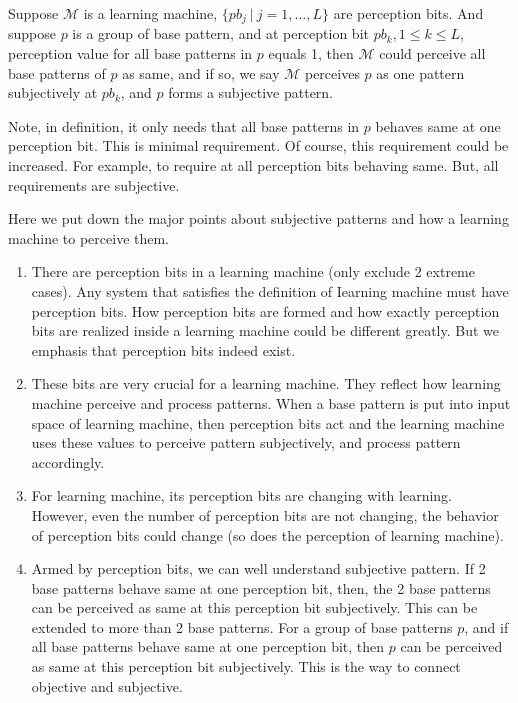 \begin{definition}
Suppose $\mathcal{M}$ is a learning machine, $\{pb_j \ |\ j = 1, \ldots, L\}$ are perception bits. And suppose $p$ is a group of base pattern, and  at perception bit $pb_k, 1\le k \le L$, perception value for all base patterns in $p$ equals 1, then $\mathcal{M}$ could perceive all base patterns of $p$ as same, and if so, we say $\mathcal{M}$ perceives $p$ as one pattern subjectively at $pb_k$, and $p$ forms a subjective pattern. 
\end{definition}
Note, in definition, it only needs that all base patterns in $p$ behaves same at one perception bit. This is minimal requirement. Of course, this requirement could be increased. For example, to require at all perception bits behaving same. But, all requirements are subjective.



Here we put down the major points about subjective patterns and how a learning machine to perceive them.
\begin{enumerate}
\item  There are perception bits in a learning machine (only exclude 2 extreme cases). Any system that satisfies the definition of Iearning machine must have perception bits. How perception bits are formed and how exactly perception bits are realized inside a learning machine could be different greatly. But we emphasis that perception bits indeed exist. 

\item These bits are very crucial for a learning machine. They reflect how learning machine perceive and process patterns. When a base pattern is put into input space of learning machine, then perception bits act and the learning machine uses these values to perceive pattern subjectively, and process pattern accordingly. 

\item For learning machine, its perception bits are changing with learning. However, even the number of perception bits are not changing, the behavior of perception bits could change (so does the perception of learning machine). 

\item Armed by perception bits, we can well understand subjective pattern. If 2 base patterns behave same at one perception bit, then, the 2 base patterns can be perceived as same at this perception bit subjectively. This can be extended to more than 2 base patterns. For a group of base patterns $p$, and if all base patterns behave same at one perception bit, then $p$ can be perceived as same at this perception bit subjectively. This is the way to connect objective and subjective.
\end{enumerate}


